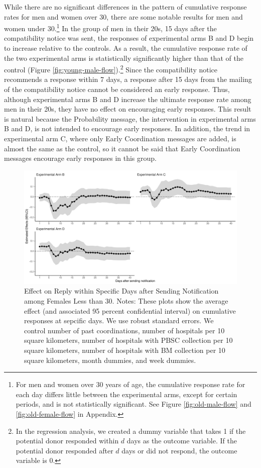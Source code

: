 \documentclass[
]{article}
\begin{document}
While there are no significant differences in the pattern of cumulative response rates for men and women over 30, there are some notable results for men and women under 30.\footnote{For men and women over 30 years of age, the cumulative response rate for each day differs little between the experimental arms, except for certain periods, and is not statistically significant. See Figure \ref{fig:old-male-flow} and \ref{fig:old-female-flow} in Appendix.} In the group of men in their 20s, 15 days after the compatibility notice was sent, the responses of experimental arms B and D begin to increase relative to the controls. As a result, the cumulative response rate of the two experimental arms is statistically significantly higher than that of the control (Figure \ref{fig:young-male-flow}).\footnote{In the regression analysis, we created a dummy variable that takes 1 if the potential donor responded within \(d\) days as the outcome variable. If the potential donor responded after \(d\) days or did not respond, the outcome variable is 0.} Since the compatibility notice recommends a response within 7 days, a response after 15 days from the mailing of the compatibility notice cannot be considered an early response. Thus, although experimental arms B and D increase the ultimate response rate among men in their 20s, they have no effect on encouraging early responses. This result is natural because the Probability message, the intervention in experimental arms B and D, is not intended to encourage early responses. In addition, the trend in experimental arm C, where only Early Coordination messages are added, is almost the same as the control, so it cannot be said that Early Coordination messages encourage early responses in this group.

\begin{figure}[t]
\includegraphics{body_files/figure-latex/young-female-flow-1} \caption{Effect on Reply within Specific Days after Sending Notification among Females Less than 30. Notes: These plots show the average effect (and associated 95 percent confidential interval) on cumulative responses at sepcific days. We use robust standard errors. We control number of past coordinations, number of hospitals per 10 square kilometers, number of hospitals with PBSC collection per 10 square kilometers, number of hospitals with BM collection per 10 square kilometers, month dummies, and week dummies.}\label{fig:young-female-flow}
\end{figure}
\end{document}

